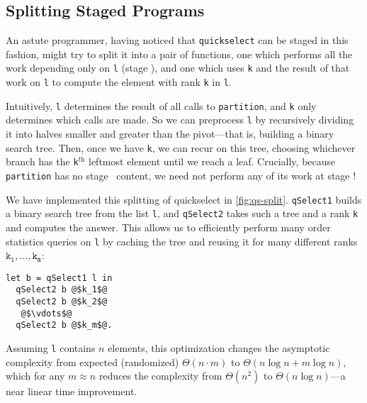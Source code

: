 


\subsection{Splitting Staged Programs}



An astute programmer, having noticed that \texttt{quickselect} can be staged in
this fashion, might try to split it into a pair of functions, one which performs
all the work depending only on \texttt{l} (stage \bbone), and one which uses
\texttt{k} and the result of that work on \texttt{l} to compute the element with
rank \texttt{k} in \texttt{l}. 

Intuitively, \texttt{l} determines the result of all calls to
\texttt{partition}, and \texttt{k} only determines which calls are made. So we
can preprocess \texttt{l} by recursively dividing it into halves smaller and
greater than the pivot---that is, building a binary search tree. Then, once we
have \texttt{k}, we can recur on this tree, choosing whichever branch has the
\texttt{k}${}^\textit{th}$ leftmost element until we reach a leaf. Crucially,
because \texttt{partition} has no stage \bbtwo\ content, we need not perform any
of its work at stage \bbtwo!

We have implemented this splitting of quickselect in \ref{fig:qs-split}.
\texttt{qSelect1} builds a binary search tree from the list \texttt{l}, and
\texttt{qSelect2} takes such a tree and a rank \texttt{k} and computes the
answer. This allows us to efficiently perform many order statistics queries on
\texttt{l} by caching the tree and reusing it for many different ranks
$\mathtt{k_1},\dots,\mathtt{k_m}$:
%
\begin{lstlisting}
let b = qSelect1 l in
  qSelect2 b @$k_1$@
  qSelect2 b @$k_2$@
   @$\vdots$@ 
  qSelect2 b @$k_m$@.
\end{lstlisting}

Assuming \texttt{l} contains $n$ elements, this optimization changes the
asymptotic complexity from expected (randomized) $\Theta(n \cdot m)$ to
$\Theta(n\log{n} + m\log{n})$, which for any $m \approx n$ reduces the
complexity from $\Theta (n^2)$ to $\Theta(n\log{n})$---a near linear time
improvement. 

